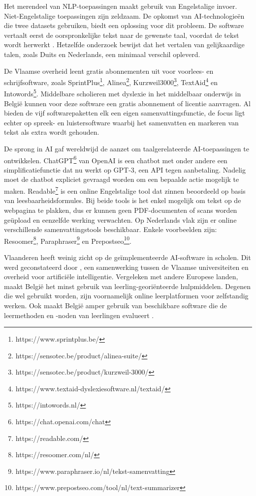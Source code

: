 Het merendeel van NLP-toepassingen maakt gebruik van Engelstalige invoer. Niet-Engelstalige toepassingen zijn zeldzaam. De opkomst van AI-technologieën die twee datasets gebruiken, biedt een oplossing voor dit probleem. De software vertaalt eerst de oorspronkelijke tekst naar de gewenste taal, voordat de tekst wordt herwerkt \autocite{Sciforce2020}. Hetzelfde onderzoek bewijst dat het vertalen van gelijkaardige talen, zoals Duits en Nederlands, een minimaal verschil opleverd.

De Vlaamse overheid leent gratis abonnementen uit voor voorlees- en schrijfsoftware, zoals \newline SprintPlus\footnote{https://www.sprintplus.be/}, Alinea\footnote{https://sensotec.be/product/alinea-suite/}, Kurzweil3000\footnote{https://sensotec.be/product/kurzweil-3000/}, TextAid\footnote{https://www.textaid-dyslexiesoftware.nl/textaid/} en Intowords\footnote{https://intowords.nl/}. Middelbare scholieren met dyslexie in het middelbaar onderwijs in België kunnen voor deze software een gratis abonnement of licentie aanvragen. Al bieden de vijf softwarepaketten elk een eigen samenvattingsfunctie, de focus ligt echter op spreek- en luistersoftware waarbij het samenvatten en markeren van tekst als extra wordt gehouden.

De sprong in AI gaf wereldwijd de aanzet om taalgerelateerde AI-toepassingen te ontwikkelen. ChatGPT\footnote{https://chat.openai.com/chat} van OpenAI is een chatbot met onder andere een simplificatiefunctie dat nu werkt op GPT-3, een API tegen aanbetaling. Nadelig moet de chatbot expliciet gevraagd worden om een bepaalde actie mogelijk te maken. Readable\footnote{https://readable.com/} is een online Engelstalige tool dat zinnen beoordeeld op basis van leesbaarheidsformules. Bij beide tools is het enkel mogelijk om tekst op de webpagina te plakken, dus er kunnen geen PDF-documenten of scans worden geüpload en eenzelfde werking verwachten. Op Nederlands vlak zijn er online verschillende samenvattingstools beschikbaar. Enkele voorbeelden zijn: Resoomer\footnote{https://resoomer.com/nl/}, Paraphraser\footnote{https://www.paraphraser.io/nl/tekst-samenvatting} en Prepostseo\footnote{https://www.prepostseo.com/tool/nl/text-summarizer}.

Vlaanderen heeft weinig zicht op de geïmplementeerde AI-software in scholen. Dit werd geconstateerd door \autocite{Martens2021}, een samenwerking tussen de Vlaamse universiteiten en overheid voor artificiële intelligentie. Vergeleken met andere Europese landen, maakt België het minst gebruik van leerling-georiënteerde hulpmiddelen. Degenen die wel gebruikt worden, zijn voornamelijk online leerplatformen voor zelfstandig werken. Ook maakt België amper gebruik van beschikbare software die de leermethoden en -noden van leerlingen evalueert \autocite{Martens2021a}. 

